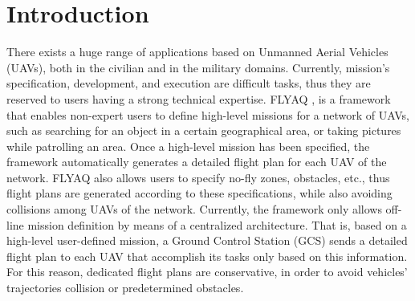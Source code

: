 \documentclass[letterpaper, 10 pt, conference]{ieeeconf}
\begin{document}
\section{Introduction}\label{sec:Introduction}
There exists a huge range of applications based on Unmanned Aerial Vehicles (UAVs), both in the civilian and in the military domains.
Currently, mission's specification, development, and execution are difficult tasks, thus they are reserved to users having a strong technical expertise.
%
FLYAQ \cite{FlyAQ:2015},\cite{FLYAQ:2016} is a framework that enables non-expert users to define high-level missions for a network of UAVs, such as searching for an object in a certain geographical area, or taking pictures while patrolling an area. Once a high-level mission has been specified, the framework automatically generates a detailed flight plan for each UAV of the network. FLYAQ also allows users to specify no-fly zones, obstacles, etc., thus flight plans are generated according to these specifications, while also avoiding collisions among UAVs of the network. 
%
Currently, the framework only allows off-line mission definition by means of a centralized architecture. That is, based on a high-level user-defined mission, a Ground Control Station (GCS) sends a detailed flight plan to each UAV that accomplish its tasks only based on this information. 
For this reason, dedicated flight plans are conservative, in order to avoid vehicles' trajectories collision or predetermined obstacles.
\end{document}
